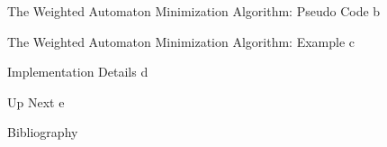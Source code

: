 \documentclass[rgb]{beamer}
\begin{document}
    \begin{frame}{The Weighted Automaton Minimization Algorithm: Pseudo Code}
        b%
    \end{frame}

    \begin{frame}{The Weighted Automaton Minimization Algorithm: Example}
        c%
    \end{frame}
    
    \begin{frame}{Implementation Details}
        d
    \end{frame}
    
    
    \begin{frame}{Up Next}
        e
    \end{frame}
  
    
    \begin{frame}{Bibliography}
        \printbibliography
    \end{frame}
\end{document}
